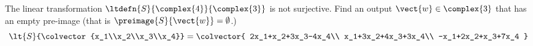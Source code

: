 The linear transformation $\ltdefn{S}{\complex{4}}{\complex{3}}$ is not surjective.  Find an output $\vect{w}\in\complex{3}$ that has an empty pre-image (that is $\preimage{S}{\vect{w}}=\emptyset$.)
%
\begin{equation*}
\lt{S}{\colvector{x_1\\x_2\\x_3\\x_4}}=
\colvector{
2x_1+x_2+3x_3-4x_4\\
x_1+3x_2+4x_3+3x_4\\
-x_1+2x_2+x_3+7x_4
}
\end{equation*}
%